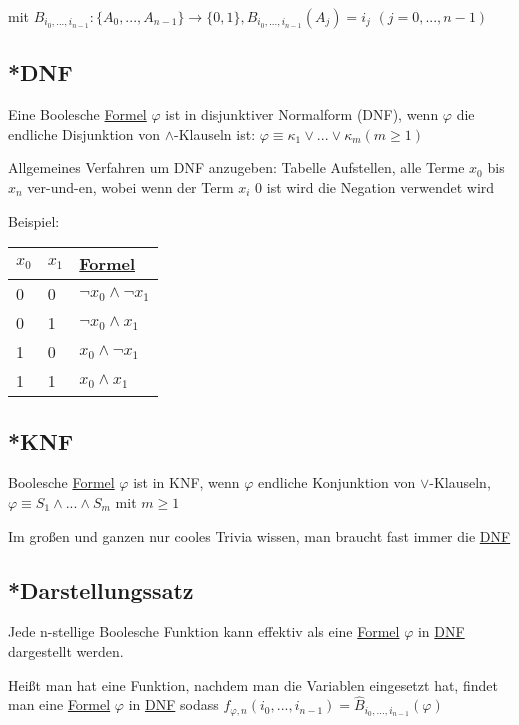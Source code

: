 \documentclass[12pt,a4paper]{article} %
\begin{document}
	mit $B_{i_0, ..., i_{n - 1}}: \{A_0, ..., A_{n - 1}\} \rightarrow \{0, 1\}, B_{i_0, ..., i_{n - 1}}(A_j) = i_j$ $(j = 0, ..., n - 1)$
	
	\subsection{*DNF}
	\label{DNF}
	Eine Boolesche \hyperref[Formel]{Formel} $\varphi$ ist in disjunktiver Normalform (DNF), wenn
	$\varphi$ die endliche Disjunktion von $\land$-Klauseln ist: $\varphi \equiv \kappa_1 \lor ... \lor \kappa_m (m \ge 1)$
	
	Allgemeines Verfahren um DNF anzugeben: Tabelle Aufstellen, alle Terme $x_0$ bis $x_n$ ver-und-en, wobei wenn der Term $x_i$ 0 ist wird die Negation verwendet wird
	
	Beispiel:
	
	\begin{tabular}{l | l | l}
		$x_0$ & $x_1$ & \hyperref[Formel]{Formel} \\ \hline
		0 & 0 & $\neg x_0 \land \neg x_1$ \\
		0 & 1 & $\neg x_0 \land x_1$ \\
		1 & 0 & $x_0 \land \neg x_1$ \\
		1 & 1 & $x_0 \land x_1$ \\
	\end{tabular}
	
	\subsection{*KNF}
	Boolesche \hyperref[Formel]{Formel} $\varphi$ ist in KNF, wenn $\varphi$ endliche Konjunktion von $\lor$-Klauseln, $\varphi \equiv S_1 \land ... \land S_m$ mit $m \ge 1$
	
	Im großen und ganzen nur cooles Trivia wissen, man braucht fast immer die \hyperref[DNF]{DNF}
	
	\subsection{*Darstellungssatz}
	Jede n-stellige Boolesche Funktion kann effektiv als eine \hyperref[Formel]{Formel} $\varphi$ in \hyperref[DNF]{DNF} dargestellt werden. 
	
	Heißt man hat eine Funktion, nachdem man die Variablen eingesetzt hat, findet man eine \hyperref[Formel]{Formel} $\varphi$ in \hyperref[DNF]{DNF} sodass $f_{\varphi, n}(i_0, ..., i_{n-1}) = \widehat{B}_{i_0, ..., i_{n - 1}}(\varphi)$
	
\end{document}
